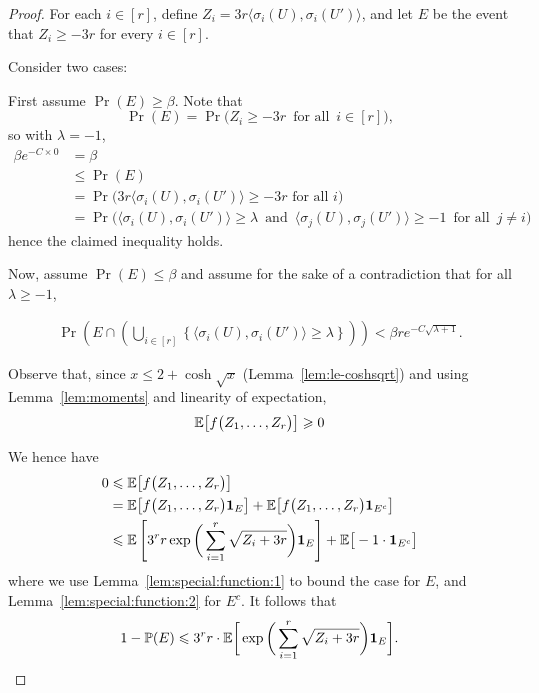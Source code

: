 \begin{proof}
  For each \(i \in [r]\), define \(Z_i = 3r\big\langle \sigma_i(U),\sigma_i(U') \big\rangle\), and let \(E\) be the event that \(Z_i \ge -3r\) for every \(i \in [r]\).

  Consider two cases:

  First assume \(\Pr(E) \ge \beta\). Note that
  \begin{equation*}
    \Pr(E) = \Pr\Big( Z_i \ge - 3r \, \text{ for all } \, i \in [r] \Big),
  \end{equation*}
  so with \(\lambda = -1\),
  \begin{align*}
    \beta e^{-C\times 0} &= \beta\\
    &\le \Pr(E)\\
    &= \Pr\Big(3r\big\langle \sigma_i(U),\sigma_i(U') \big\rangle \ge -3r \text{ for all }i\Big)\\
    &= \Pr\Big( \big\langle \sigma_i(U),\sigma_i(U') \big\rangle \ge \lambda \, \text{ and } \, \big\langle \sigma_j(U), \sigma_j(U') \big\rangle \ge -1 \, \text{ for all } \, j \ne i \Big)
  \end{align*}
  hence the claimed inequality holds.

  Now, assume \(\Pr(E) \le \beta\) and assume for the sake of a contradiction that for all \(\lambda \geq -1\),

  \begin{align}\label{eq:max:big:and:E:no}
    \Pr\left(E \cap \left( \bigcup_{i \in [r]} \left\{ \big\langle \sigma_i(U),\sigma_i(U') \big\rangle \ge \lambda \right\}\right)\right) < \beta r e^{-C\sqrt{\lambda + 1}}.
  \end{align}

  Observe that, since \(x \le 2 + \cosh\sqrt{x}\) (Lemma~\ref{lem:le-coshsqrt}) and using Lemma~\ref{lem:moments} and linearity of expectation,
  \[
    \mathbb{E}\big[ f\big( Z_1,\ldots,Z_r \big) \big] \geqslant 0
  \]

  We hence have
  \begin{align*}
    0 &\leqslant \mathbb{E}\big[ f\big( Z_1,\ldots,Z_r \big) \big]\\
    &= \mathbb{E}\big[ f\big( Z_1,\ldots,Z_r \big)  \mathbf{1}_E \big] + \mathbb{E}\big[ f\big( Z_1,\ldots,Z_r \big) \mathbf{1}_{E^c} \big]\\
    &\leqslant \mathbb{E}\left[ 3^r r \exp\bigg( \displaystyle\sum_{i = 1}^r \sqrt{ Z_i + 3r } \bigg)  \mathbf{1}_E \right] + \mathbb{E}\big[-1 \cdot \mathbf{1}_{E^c} \big]
  \end{align*}
  where we use Lemma~\ref{lem:special:function:1} to bound the case for \(E\), and Lemma~\ref{lem:special:function:2} for \(E^c\).
  It follows that
  \begin{equation}\label{eq:eventE:inequality}
    1 - \mathbb{P}(E) \leqslant 3^r r \cdot \mathbb{E}\bigg[ \exp\bigg( \sum_{i = 1}^r \sqrt{ Z_i + 3r } \bigg) \mathbf{1}_E \bigg].
  \end{equation}


\end{proof}
